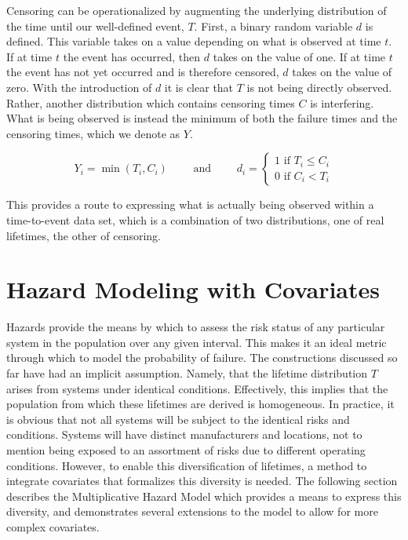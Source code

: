 Censoring can be operationalized by augmenting the underlying distribution of the time until our well-defined event, $T$. First, a binary random variable $d$ is defined. This variable takes on a value depending on what is observed at time $t$. If at time $t$ the event has occurred, then $d$ takes on the value of one. If at time $t$ the event has not yet occurred and is therefore censored, $d$ takes on the value of zero. With the introduction of $d$ it is clear that $T$ is not being directly observed. Rather, another distribution which contains censoring times $C$ is interfering. What is being observed is instead the minimum of both the failure times and the censoring times, which we denote as $Y$.

$$  Y_i = \min(T_i,C_i) \qquad \text{ and } \qquad d_i = \left\{\begin{matrix} 1 \text{ if } T_i \le C_i\\ 0 \text{ if } C_i < T_i \end{matrix}\right. $$

This provides a route to expressing what is actually being observed within a time-to-event data set, which is a combination of two distributions, one of real lifetimes, the other of censoring. 



\section*{Hazard Modeling with Covariates}


Hazards provide the means by which to assess the risk status of any particular system in the population over any given interval. This makes it an ideal metric through which to model the probability of failure. The constructions discussed so far have had an implicit assumption. Namely, that the lifetime distribution $T$ arises from systems under identical conditions. Effectively, this implies that the population from which these lifetimes are derived is homogeneous. In practice, it is obvious that not all systems will be subject to the identical risks and conditions. Systems will have distinct manufacturers and locations, not to mention being exposed to an assortment of risks due to different operating conditions. However, to enable this diversification of lifetimes, a method to integrate covariates that formalizes this diversity is needed. The following section describes the Multiplicative Hazard Model which provides a means to express this diversity, and demonstrates several extensions to the model to allow for more complex covariates.

